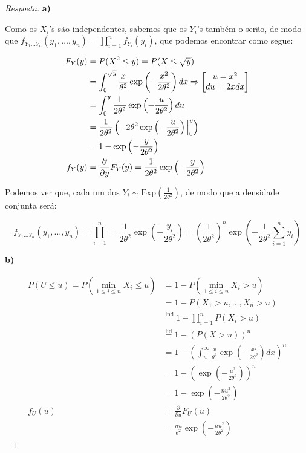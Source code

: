\documentclass[
]{article}
\theoremstyle{definition}
\theoremstyle{definition}
\theoremstyle{definition}
\theoremstyle{definition}
\theoremstyle{remark}
\begin{document}
\begin{proof}[Resposta]
\textbf{a)}

Como os \(X_{i}\)'s são independentes, sabemos que os \(Y_{i}\)'s também o serão, de modo que \(f_{Y_{1} \ldots Y_{n}}(y_{1},\ldots,y_{n}) = \prod_{i=1}^{n}f_{Y_{i}}(y_{i})\), que podemos encontrar como segue:

\begin{align*}
F_{Y}(y) &= P(X^{2} \le y) = P(X \le \sqrt{y}) \\
&= \int_{0}^{\sqrt{y}}\frac{x}{\theta^{2}}\exp\left(-\frac{x^{2}}{2\theta^{2}}\right)dx \Rightarrow \begin{bmatrix}
u = x^{2} \\
du = 2xdx
\end{bmatrix} \\
&= \int_{0}^{y}\frac{1}{2\theta^{2}}\exp\left(-\frac{u}{2\theta^{2}}\right)du \\
&= \frac{1}{2\theta^{2}}\left(-2\theta^{2}\exp\left(-\frac{u}{2\theta^{2}}\right)\Big{|}_{0}^{y}\right) \\
&= 1 - \exp\left(-\frac{y}{2\theta^{2}}\right) \\
f_{Y}(y) &= \frac{\partial}{\partial y}F_{Y}(y) = \frac{1}{2\theta^{2}}\exp\left(-\frac{y}{2\theta^{2}}\right)
\end{align*}

Podemos ver que, cada um dos \(Y_{i} \sim \mathrm{Exp}\left(\frac{1}{2\theta^{2}}\right)\), de modo que a densidade conjunta será:

\begin{equation*}
f_{Y_{1} \ldots Y_{n}}(y_{1},\ldots,y_{n}) = \prod_{i=1}^{n} = \frac{1}{2\theta^{2}}\exp\left(-\frac{y_{i}}{2\theta^{2}}\right) = \left(\frac{1}{2\theta^{2}}\right)^{n}\exp\left(-\frac{1}{2\theta^{2}}\sum_{i=1}^{n}y_{i}\right)
\end{equation*}

\textbf{b)}

\begin{align*}
P(U \le u) = P\left(\min_{1 \le i \le n}X_{i} \le u\right) &= 1 - P\left(\min_{1 \le i \le n}X_{i} > u\right) \\
&= 1 - P(X_{1} > u, \ldots, X_{n} > u) \\
&\stackrel{\text{ind}}{=} 1 - \prod_{i=1}^{n}P(X_{i} > u) \\
&\stackrel{\text{iid}}{=} 1 - \left(P(X > u)\right)^{n} \\
&= 1 - \left(\int_{u}^{\infty}\frac{x}{\theta^{2}}\exp\left(-\frac{x^{2}}{2\theta^{2}}\right)dx\right)^{n} \\
&= 1 - \left(\exp\left(-\frac{u^{2}}{2\theta^{2}}\right)\right)^{n} \\
&= 1 - \exp\left(-\frac{nu^{2}}{2\theta^{2}}\right) \\
f_{U}(u) &= \frac{\partial}{\partial u}F_{U}(u) \\
&= \frac{nu}{\theta^{2}}\exp\left(-\frac{nu^{2}}{2\theta^{2}}\right)
\end{align*}


\end{proof}
\end{document}
